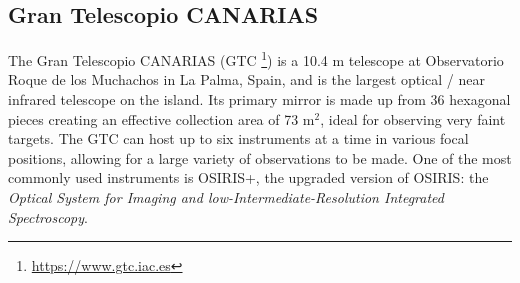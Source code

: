 \documentclass[a4paper,oneside,12pt, class=Latex/Classes/PhDthesisPSnPDF, crop=false]{standalone}
\begin{document}

\subsection{Gran Telescopio CANARIAS}
\label{GTC}
The Gran Telescopio CANARIAS (GTC \footnote{\url{https://www.gtc.iac.es}}) is a 10.4 m telescope at Observatorio Roque de los Muchachos in La Palma, Spain, and is the largest optical / near infrared telescope on the island. Its primary mirror is made up from 36 hexagonal pieces creating an effective collection area of 73 m$^2$, ideal for observing very faint targets. The GTC can host up to six instruments at a time in various focal positions, allowing for a large variety of observations to be made. One of the most commonly used instruments is OSIRIS+, the upgraded version of OSIRIS: the \textit{Optical System for Imaging and low-Intermediate-Resolution Integrated Spectroscopy}.
\end{document}
